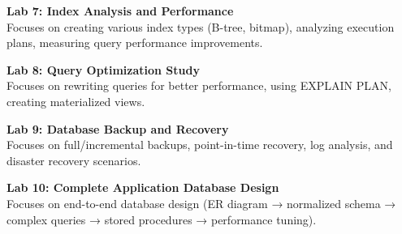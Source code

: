 \vspace{0.2cm}

\noindent\textbf{Lab 7: Index Analysis and Performance} \\
Focuses on creating various index types (B-tree, bitmap), analyzing execution plans, measuring query performance improvements.

\vspace{0.2cm}

\noindent\textbf{Lab 8: Query Optimization Study} \\
Focuses on rewriting queries for better performance, using EXPLAIN PLAN, creating materialized views.

\vspace{0.2cm}

\noindent\textbf{Lab 9: Database Backup and Recovery} \\
Focuses on full/incremental backups, point-in-time recovery, log analysis, and disaster recovery scenarios.

\vspace{0.2cm}

\noindent\textbf{Lab 10: Complete Application Database Design} \\
Focuses on end-to-end database design (ER diagram → normalized schema → complex queries → stored procedures → performance tuning).

\vspace{0.2cm}

\newpage
{}

